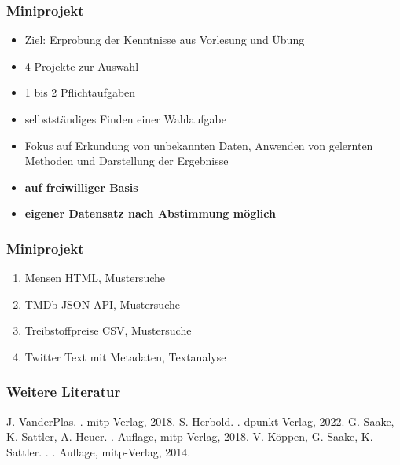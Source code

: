 \begin{frame}

\frametitle{Miniprojekt}

\begin{itemize}
\item Ziel: Erprobung der Kenntnisse aus Vorlesung und Übung
\item 4 Projekte zur Auswahl
\item 1 bis 2 Pflichtaufgaben
\item selbstständiges Finden einer Wahlaufgabe
\item Fokus auf Erkundung von unbekannten Daten, Anwenden von gelernten Methoden und Darstellung der Ergebnisse
\item \textbf{\color{red} auf freiwilliger Basis}
\item \textbf{\color{red} eigener Datensatz nach Abstimmung möglich}
\end{itemize}

\end{frame}

  
\begin{frame}

\frametitle{Miniprojekt}

\begin{enumerate}
\item Mensen {\tiny HTML, Mustersuche}
\item TMDb {\tiny JSON API, Mustersuche}
\item Treibstoffpreise {\tiny CSV, Mustersuche}
\item Twitter {\tiny Text mit Metadaten, Textanalyse}
\end{enumerate}

\end{frame}
  
  
  
  \begin{frame}
    \frametitle{Weitere Literatur}
  
    \begin{thebibliography}{Ester, 2000}
     J. VanderPlas.
     . 
     \newblock mitp-Verlag, 2018.  
     S. Herbold.
     . 
     \newblock dpunkt-Verlag, 2022.    
     G. Saake, K. Sattler, A. Heuer.
     . Auflage, mitp-Verlag, 2018.
     V. Köppen, G. Saake, K. Sattler.
     . 
     . Auflage, mitp-Verlag, 2014.    

  \end{thebibliography}
  
  \end{frame}
  
